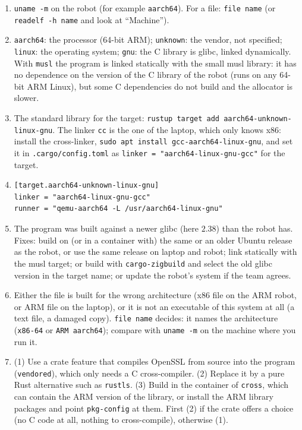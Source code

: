 \begin{enumerate}[label=\textbf{\ansnum.\arabic*}]
  \item \verb!uname -m! on the robot (for example \verb!aarch64!). For a file: \verb!file name! (or \verb!readelf -h name! and look at ``Machine'').
  \item \verb!aarch64!: the processor (64-bit ARM); \verb!unknown!: the vendor, not specified; \verb!linux!: the operating system; \verb!gnu!: the C library is glibc, linked dynamically. With \verb!musl! the program is linked statically with the small musl library: it has no dependence on the version of the C library of the robot (runs on any 64-bit ARM Linux), but some C dependencies do not build and the allocator is slower.
  \item The standard library for the target: \verb!rustup target add aarch64-unknown-linux-gnu!. The linker \verb!cc! is the one of the laptop, which only knows x86: install the cross-linker, \verb!sudo apt install gcc-aarch64-linux-gnu!, and set it in \verb!.cargo/config.toml! as \verb!linker = "aarch64-linux-gnu-gcc"! for the target.
  \item
\begin{verbatim}
[target.aarch64-unknown-linux-gnu]
linker = "aarch64-linux-gnu-gcc"
runner = "qemu-aarch64 -L /usr/aarch64-linux-gnu"
\end{verbatim}
  \item The program was built against a newer glibc (here $2.38$) than the robot has. Fixes: build on (or in a container with) the same or an older Ubuntu release as the robot, or use the same release on laptop and robot; link statically with the musl target; or build with \verb!cargo-zigbuild! and select the old glibc version in the target name; or update the robot's system if the team agrees.
  \item Either the file is built for the wrong architecture (x86 file on the ARM robot, or ARM file on the laptop), or it is not an executable of this system at all (a text file, a damaged copy). \verb!file name! decides: it names the architecture (\verb!x86-64! or \verb!ARM aarch64!); compare with \verb!uname -m! on the machine where you run it.
  \item (1) Use a crate feature that compiles OpenSSL from source into the program (\verb!vendored!), which only needs a C cross-compiler. (2) Replace it by a pure Rust alternative such as \verb!rustls!. (3) Build in the container of \verb!cross!, which can contain the ARM version of the library, or install the ARM library packages and point \verb!pkg-config! at them. First (2) if the crate offers a choice (no C code at all, nothing to cross-compile), otherwise (1).

\end{enumerate}
